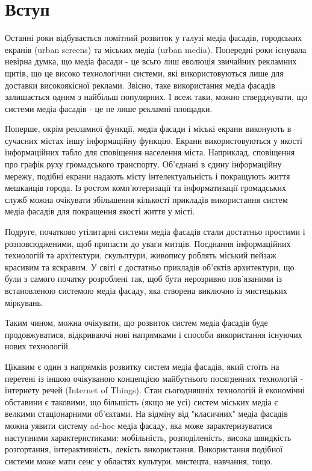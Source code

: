 \documentclass[a4paper,ukrainian,utf8,nocolumnsxix,floatsection,equationsection]{eskdtext}
\let\stdsection\section
\renewcommand\section{\clearpage\stdsection}
\newcommand{\sectionnonum}[1]{\section*{#1}\addcontentsline{toc}{section}{#1}}
\begin{document}


{}
% 

\tableofcontents


\sectionnonum{Вступ}
\label{sec:intro}

Останні роки відбувається помітний розвиток у галузі медіа фасадів, городських екранів (urban screens) та міських медіа (urban media). Попередні роки існувала невірна думка, що медіа фасади - це всьго лиш еволюція звичайних рекламних щитів, що це високо технологічни системи, які використовуються лише для доставки високоякісної реклами. Звісно, таке використання медіа фасадів залишається одним з найбільш популярних. І всеж таки, можно стверджувати, що системи медіа фасадів - це не лише рекламні площадки. 

Поперше, окрім рекламної функції, медіа фасади і міські екрани виконують в сучасних містах іншу інформаційну функцію. Екрани використовуються у якості інформаційних табло для сповіщення населення міста. Наприклад, сповіщення про графік руху громадського транспорту. Об’єднані в єдину інформаційну мережу, подібні екрани надають місту інтелектуальність і покращують життя мешканців города. Із ростом комп’ютеризації та інформатизації громадських служб можна очікувати збільшення кількості прикладів використання систем медіа фасадів для покращення якості життя у місті.

Подруге, початково утілитарні системи медіа фасадів стали достатньо простими і розповсюдженими, щоб припасти до уваги митців. Поєднання інформаційних технологій та архітектури, скульптури, живопису роблять міський пейзаж красивим та яскравим. У світі є достатньо прикладів об’єктів архитектури, що були з самого початку розроблені так, щоб бути нерозривно пов’язаними із встановленою системою медіа фасаду, яка створена виключно із мистецьких міркувань. 

Таким чином, можна очікувати, що розвиток систем медіа фасадів буде продовжуватися, відкриваючі нові напрямками і способи використання існуючих нових технологій. 

Цікавим є один з напрямків розвитку систем медіа фасадів, який стоїть на перетені із іншою очікуваною концепцією майбутнього посягденних технологій - інтернету речей (Internet of Things). Стан сьогодняшніх технологій й економічні обставини є таковими, що більшість (якщо не усі) систем міських медіа є велкими стаціонарними об’єктами. На відміну від "класичних" медіа фасадів можна уявити систему ad-hoc медіа фасаду, яка може зарактеризуватися наступними характеристиками: мобільність, розподіленість, висока швидкість розгортання, інтерактивність, лекість використання. Використання подібної системи може мати сенс у областях культури, мистецта, навчання, тощо.
\end{document}
